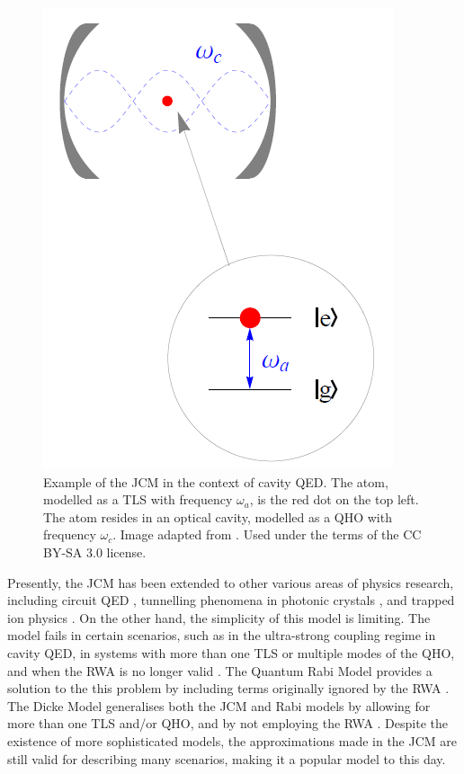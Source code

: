 \documentclass[12pt,a4paper]{article}
\begin{document}
\begin{figure}[h]
    \centering
    \includegraphics[scale=0.6]{Jaynes-Cummings_model.png}
    \caption{Example of the JCM in the context of cavity QED. The atom, modelled as a TLS with frequency $\omega_a$, is the red dot on the top left. The atom resides in an optical cavity, modelled as a QHO with frequency $\omega_c$. Image adapted from \cite{Image-Prince_JCM}. Used under the terms of the CC BY-SA 3.0 license.}
    \label{fig:1_JCM}
\end{figure}

\vspace{0.4cm}

Presently, the JCM has been extended to other various areas of physics research, including circuit QED \cite{Context2018-Supercond_qubit}, tunnelling phenomena in photonic crystals \cite{Context2012-Tunneling_photons}, and trapped ion physics \cite{Context1992-Trapped_ions}. On the other hand, the simplicity of this model is limiting. The model fails in certain scenarios, such as in the ultra-strong coupling regime in cavity QED, in systems with more than one TLS or multiple modes of the QHO, and when the RWA is no longer valid \cite{General2024-JC_overview}. The Quantum Rabi Model provides a solution to the this problem by including terms originally ignored by the RWA \cite{General2024-JC_overview}. The Dicke Model generalises both the JCM and Rabi models by allowing for more than one TLS and/or QHO, and by not employing the RWA \cite{General2024-JC_overview}. Despite the existence of more sophisticated models, the approximations made in the JCM are still valid for describing many scenarios, making it a popular model to this day. 
\end{document}
